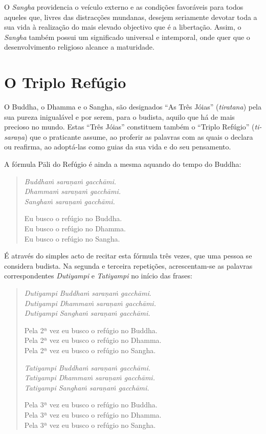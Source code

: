 O \emph{Sangha} providencia o veículo externo e as condições favoráveis para
todos aqueles que, livres das distracções mundanas, desejem seriamente devotar
toda a sua vida à realização do mais elevado objectivo que é a libertação.
Assim, o \emph{Sangha} também possui um significado universal e intemporal, onde
quer que o desenvolvimento religioso alcance a maturidade.

\section{O Triplo Refúgio}

O Buddha, o Dhamma e o Sangha, são designados ``As Três Jóias''
(\emph{tiratana}) pela sua pureza inigualável e por serem, para o budista,
aquilo que há de mais precioso no mundo. Estas ``Três Jóias'' constituem também
o ``Triplo Refúgio'' (\emph{ti-saraṇa}) que o praticante assume, ao proferir as
palavras com as quais o declara ou reafirma, ao adoptá-las como guias da sua
vida e do seu pensamento.

A fórmula Pāli do Refúgio é ainda a mesma aquando do tempo do Buddha:

\begin{verse}
  \emph{Buddhaṁ saraṇaṁ gacchāmi.}\\
  \emph{Dhammaṁ saraṇaṁ gacchāmi.}\\
  \emph{Sanghaṁ saraṇaṁ gacchāmi.}

  Eu busco o refúgio no Buddha.\\
  Eu busco o refúgio no Dhamma.\\
  Eu busco o refúgio no Sangha.
\end{verse}

É através do simples acto de recitar esta fórmula três vezes, que uma pessoa se
considera budista. Na segunda e terceira repetições, acrescentam-se as palavras
correspondentes \emph{Dutiyampi} e \emph{Tatiyampi} no início das frases:

\begin{verse}
  \emph{Dutiyampi Buddhaṁ saraṇaṁ gacchāmi}.\\
  \emph{Dutiyampi Dhammaṁ saraṇaṁ gacchāmi.}\\
  \emph{Dutiyampi Sanghaṁ saraṇaṁ gacchāmi.}

  Pela 2ª vez eu busco o refúgio no Buddha.\\
  Pela 2ª vez eu busco o refúgio no Dhamma.\\
  Pela 2ª vez eu busco o refúgio no Sangha.

  \emph{Tatiyampi Buddhaṁ saraṇaṁ gacchāmi.}\\
  \emph{Tatiyampi Dhammaṁ saraṇaṁ gacchāmi.}\\
  \emph{Tatiyampi Sanghaṁ saraṇaṁ gacchāmi.}

  Pela 3ª vez eu busco o refúgio no Buddha.\\
  Pela 3ª vez eu busco o refúgio no Dhamma.\\
  Pela 3ª vez eu busco o refúgio no Sangha.
\end{verse}

